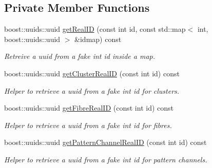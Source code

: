 \subsection*{\-Private \-Member \-Functions}
\begin{DoxyCompactItemize}
\item 
boost\-::uuids\-::uuid \hyperlink{classcryomesh_1_1manager_1_1Creator_a1d848c7a78e970a49693434dad741880}{get\-Real\-I\-D} (const int id, const std\-::map$<$ int, boost\-::uuids\-::uuid $>$ \&idmap) const 
\begin{DoxyCompactList}\small\item\em \-Retreive a uuid from a fake int id inside a map. \end{DoxyCompactList}\item 
boost\-::uuids\-::uuid \hyperlink{classcryomesh_1_1manager_1_1Creator_a1f8a19ce5f8e07015b3bbc7040ac2a8e}{get\-Cluster\-Real\-I\-D} (const int id) const 
\begin{DoxyCompactList}\small\item\em \-Helper to retrieve a uuid from a fake int id for clusters. \end{DoxyCompactList}\item 
boost\-::uuids\-::uuid \hyperlink{classcryomesh_1_1manager_1_1Creator_ab6987a15c0794e7cd651519c28ad7eec}{get\-Fibre\-Real\-I\-D} (const int id) const 
\begin{DoxyCompactList}\small\item\em \-Helper to retrieve a uuid from a fake int id for fibres. \end{DoxyCompactList}\item 
boost\-::uuids\-::uuid \hyperlink{classcryomesh_1_1manager_1_1Creator_aeb8b3b6fddffcefb7f81780a81f5f28c}{get\-Pattern\-Channel\-Real\-I\-D} (const int id) const 
\begin{DoxyCompactList}\small\item\em \-Helper to retrieve a uuid from a fake int id for pattern channels. \end{DoxyCompactList}\end{DoxyCompactItemize}
